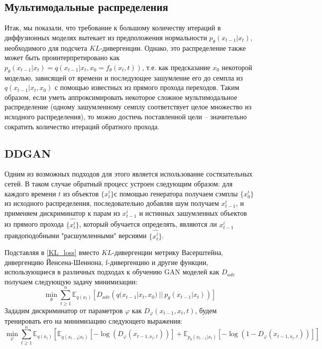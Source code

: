 \documentclass{article}
\begin{document}
 \subsection{Мультимодальные распределения}
Итак, мы показали, что требование к большому количеству итераций в диффузионных моделях вытекает из предположения нормальности $p_\theta(x_{t-1}|x_t)$, необходимого для подсчета $KL$-дивергенции. Однако, это распределение также может быть проинтерпретировано 
как $p_\theta(x_{t-1}|x_t) = q(x_{t-1}|x_t,x_0 = f_\theta(x_t, t))$, т.е. как предсказание $x_0$ некоторой моделью, зависящей от времени и последующее зашумление его до семпла из $q(x_{t-1}|x_t,x_0)$ с помощью известных из прямого прохода переходов. Таким образом, если уметь аппроксимировать некоторое сложное мультимодальное распределение (одному зашумленному семплу соответствует целое множество из исходного распределения), то можно достичь поставленной цели -- значительно сократить количество итераций обратного прохода. 
\subsection{DDGAN}
Одним из возможных подходов для этого является использование состязательных сетей. В таком случае обратный процесс устроен следующим образом: для каждого времени $t$ из объектов $\{x_t^i\}$с помощью генератора получаем сэмплы $\{x_0^i\}$ из исходного распределения, последовательно добавляя шум получаем $x_{t-1}^i$, и применяем дискриминатор к парам из $x_{t-1}^i$ и истинных зашумленных объектов из прямого прохода $\{\widehat{x_t^i}\}$, который обучается определять, являются ли $x_{t-1}^i$ правдоподобными "расшумленными" версиями $\{\widehat{x_t^i}\}$. 

Подставляя в \ref{KL_loss} вместо $KL$-дивергенции метрику Васерштейна, дивергенцию Йенсена-Шеннона, f-дивергенцию и другие функции, использующиеся в различных подходах к обучению GAN моделей \cite{https://doi.org/10.48550/arxiv.1406.2661, 
		https://doi.org/10.48550/arxiv.1701.07875,
		https://doi.org/10.48550/arxiv.1606.00709,
		https://doi.org/10.48550/arxiv.2010.08029} 
как $D_{adv}$
получаем следующую задачу минимизации:
 \begin{equation}
	\min\limits_\theta\sum\limits_{t\geqslant 1}^n \mathbb{E}_{q(x_t)}[ D_{adv}\left(q(x_{t-1}|x_t, x_0)~||~p_\theta(x_{t-1}|x_t)  \right)]
\end{equation}
Зададим дискриминатор от параметров $\varphi$ как $D_\varphi(x_{t-1}, x_t, t)$, будем тренировать его на минимизацию следующего выражения:
 \begin{equation}
	\min\limits_\varphi\sum\limits_{t\geqslant 1}^n \mathbb{E}_{q(x_t)}[\mathbb{E}_{q(x_{t-1}|x_t)}[-\log{(D_\varphi(x_{t-1, x_t, t}))}] + \mathbb{E}_{p_\theta(x_{t-1}|x_t)}[-\log{(1 - D_\varphi(x_{t-1, x_t, t}))}]]
\end{equation}
\end{document}
